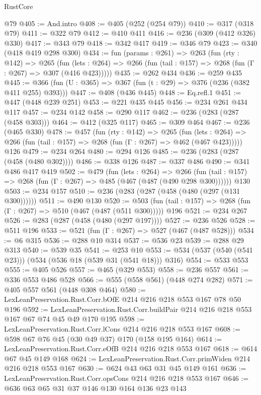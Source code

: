\begin{lexlean}{RustCore}
\begin{coremodule}
{\begin{coremodule}
{{{{{    @79
@405 := And.intro
@408 := @405 (@252 (@254 @79))
@410 := @317 (@318 @79)
@411 := @322 @79
@412 := @410 @411
@416 := @236 (@309 (@412 @326) @330)
@417 := @343 @79
@418 := @342 @417
@419 := @346 @79
@423 := @340 (@418 @419 @298 @300)
@434 := fun (params : @261) =>
  @263
    (fun (rty : @142) =>
    @265
      (fun (lets : @264) => @266 (fun (tail : @157) => @268 (fun (Γ : @267) => @307 (@416 @423)))))
@435 := @262 @434
@436 := @259 @435
@445 := @366 (fun (U : @365) => @367 (fun (t : @29) => @376 (@236 (@382 @411 @255) @393)))
@447 := @408 (@436 @445)
@448 := Eq.refl.{1}
@451 := @447 (@448 @239 @251)
@453 := @221 @435 @445
@456 := @234 @261 @434 @117
@457 := @234 @142
@458 := @290 @117
@462 := @236 (@283 (@287 (@458 @303)))
@464 := @412 (@325 @117)
@465 := @309 @464
@467 := @236 (@465 @330)
@478 := @457
    (fun (rty : @142) =>
    @265
      (fun (lets : @264) => @266 (fun (tail : @157) => @268 (fun (Γ : @267) => @462 (@467 @423)))))
    @126
@479 := @234 @264
@480 := @294 @126
@485 := @236 (@283 (@287 (@458 (@480 @302))))
@486 := @338 @126
@487 := @337 @486
@490 := @341 @486 @417 @419
@502 := @479
    (fun (lets : @264) =>
    @266 (fun (tail : @157) => @268 (fun (Γ : @267) => @485 (@467 (@487 (@490 @298 @300))))))
    @130
@503 := @234 @157
@510 := @236 (@283 (@287 (@458 (@480 (@297 (@131 @300))))))
@511 := @490 @130
@520 := @503 (fun (tail : @157) => @268 (fun (Γ : @267) => @510 (@467 (@487 (@511 @300))))) @196
@521 := @234 @267
@526 := @283 (@287 (@458 (@480 (@297 @197))))
@527 := @236 @526
@528 := @511 @196
@533 := @521 (fun (Γ : @267) => @527 (@467 (@487 @528)))
@534 := @6 @315
@536 := @288 @10 @314
@537 := @536 @23
@539 := @288 @29 @313
@540 := @539 @35
@541 := @253 @10
@553 := @534 (@537 (@540 (@541 @23))) (@534 (@536 @18 (@539 @31 (@541 @18))) @316)
@554 := @533 @553
@555 := @405 @526
@557 := @465 (@329 @553)
@558 := @236 @557
@561 := @336 @553 @486 @528
@566 := @555 (@558 @561) (@448 @274 @282)
@571 := @405 @557 @561 (@448 @308 @464)
@580 := LexLeanPreservation.Rust.Corr.bOfE @214 @216 @218 @553 @167 @78 @50 @196
@592 := LexLeanPreservation.Rust.Corr.buildPair @214 @216 @218 @553 @167 @67 @74 @45 @49 @170 @195
@598 := LexLeanPreservation.Rust.Corr.lCons @214 @216 @218 @553 @167
@608 := @598 @67 @76 @45 (@30 @49 @37) @170 (@158 @195 @164)
@614 := LexLeanPreservation.Rust.Corr.eOfB @214 @216 @218 @553 @167
@618 := @614 @67 @45 @149 @168
@624 := LexLeanPreservation.Rust.Corr.primWiden @214 @216 @218 @553 @167
@630 := @624 @43 @63 @31 @45 @149 @161
@636 := LexLeanPreservation.Rust.Corr.opsCons @214 @216 @218 @553 @167
@646 := @636 @63 @65 @31 @37 @146 @130 @164 @136 @23 @143
}}}}}
\end{coremodule}}
\end{coremodule}
\end{lexlean}
